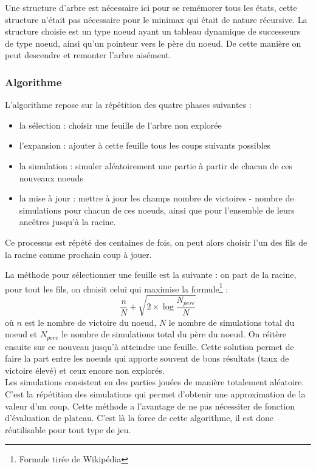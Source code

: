 \documentclass[a4paper,11pt]{article}
\begin{document}
Une structure d'arbre est nécessaire ici pour se remémorer tous les états, cette structure n'était pas nécessaire pour le minimax qui était de nature récursive. La structure choisie est un type noeud ayant un tableau dynamique de successeurs de type noeud, ainsi qu'un pointeur vers le père du noeud. De cette manière on peut descendre et remonter l'arbre aisément. \\

\subsubsection{Algorithme}

L'algorithme repose sur la répétition des quatre phases suivantes :
\begin{itemize}
    \item la sélection : choisir une feuille de l'arbre non explorée
    \item l'expansion : ajouter à cette feuille tous les coups suivants possibles
    \item la simulation : simuler aléatoirement une partie à partir de chacun de ces nouveaux noeuds
    \item la mise à jour : mettre à jour les champs nombre de victoires - nombre de simulations pour chacun de ces noeuds, ainsi que pour l'ensemble de leurs ancêtres jusqu'à la racine.
\end{itemize}
Ce processus est répété des centaines de fois, on peut alors choisir l'un des fils de la racine comme prochain coup à jouer.

La méthode pour sélectionner une feuille est la suivante : on part de la racine, pour tout les fils, on choisit celui qui maximise la formule\footnote{Formule tirée de Wikipédia} :
\begin{equation}
    \frac{n}{N} + \sqrt{ 2 \times \log{\frac{N_{pere}}{N}}}
\end{equation}
où $n$ est le nombre de victoire du noeud, $N$ le nombre de simulations total du noeud et $N_{pere}$ le nombre de simulations total du père du noeud. On réitère ensuite sur ce nouveau jusqu'à atteindre une feuille. Cette solution permet de faire la part entre les noeuds qui apporte souvent de bons résultats (taux de victoire élevé) et ceux encore non explorés. \\

Les simulations consistent en des parties jouées de manière totalement aléatoire. C'est la répétition des simulations qui permet d'obtenir une approximation de la valeur d'un coup. Cette méthode a l'avantage de ne pas nécessiter de fonction d'évaluation de plateau. C'est là la force de cette algorithme, il est donc réutilisable pour tout type de jeu.
\end{document}
